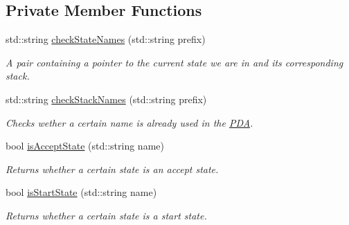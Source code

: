 \subsection*{\-Private \-Member \-Functions}
\begin{DoxyCompactItemize}
\item 
std\-::string \hyperlink{classPDA_1_1PDA_af707f305d9b16dbc3dcb686a3f63fca4}{check\-State\-Names} (std\-::string prefix)
\begin{DoxyCompactList}\small\item\em \-A pair containing a pointer to the current state we are in and its corresponding stack. \end{DoxyCompactList}\item 
std\-::string \hyperlink{classPDA_1_1PDA_a612e1d9ace98da74ea4f23fa901b6110}{check\-Stack\-Names} (std\-::string prefix)
\begin{DoxyCompactList}\small\item\em \-Checks wether a certain name is already used in the \hyperlink{classPDA_1_1PDA}{\-P\-D\-A}. \end{DoxyCompactList}\item 
bool \hyperlink{classPDA_1_1PDA_aa245040d766419cc4e9ddcd825ab6ca5}{is\-Accept\-State} (std\-::string name)
\begin{DoxyCompactList}\small\item\em \-Returns whether a certain state is an accept state. \end{DoxyCompactList}\item 
bool \hyperlink{classPDA_1_1PDA_a37329b27d0ac02e944d1160a4462fbce}{is\-Start\-State} (std\-::string name)
\begin{DoxyCompactList}\small\item\em \-Returns whether a certain state is a start state. \end{DoxyCompactList}\end{DoxyCompactItemize}
